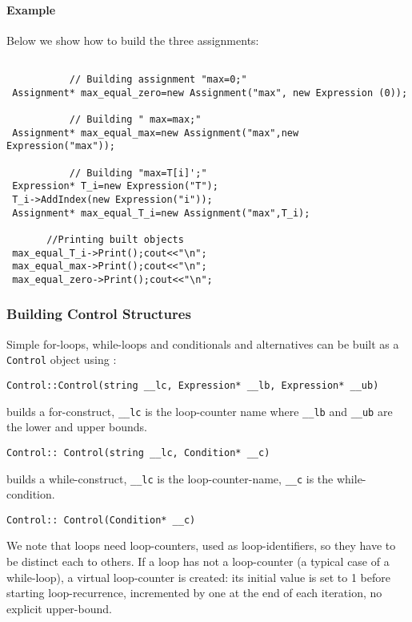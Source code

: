 \paragraph{Example}

Below we show how to build the three assignments:

\begin{lstlisting}[frame=single,framerule=0pt]

           // Building assignment "max=0;"
 Assignment* max_equal_zero=new Assignment("max", new Expression (0));

           // Building " max=max;"
 Assignment* max_equal_max=new Assignment("max",new Expression("max"));

           // Building "max=T[i]';"
 Expression* T_i=new Expression("T");
 T_i->AddIndex(new Expression("i"));
 Assignment* max_equal_T_i=new Assignment("max",T_i);

	   //Printing built objects
 max_equal_T_i->Print();cout<<"\n";
 max_equal_max->Print();cout<<"\n";
 max_equal_zero->Print();cout<<"\n";

\end{lstlisting}

\subsubsection{Building Control Structures}
Simple for-loops, while-loops and conditionals and alternatives can be built as a \verb|Control| object using :

\begin{lstlisting}[frame=single,framerule=0pt]
Control::Control(string __lc, Expression* __lb, Expression* __ub)
\end{lstlisting}
builds a for-construct, \verb|__lc| is the loop-counter name where \verb|__lb| and \verb|__ub| are the lower and upper bounds.\\
\begin{lstlisting}[frame=single,framerule=0pt]
Control:: Control(string __lc, Condition* __c)
\end{lstlisting}
builds a while-construct, \verb|__lc| is the loop-counter-name, \verb|__c| is the while-condition.\\

\begin{lstlisting}[frame=single,framerule=0pt]
Control:: Control(Condition* __c)
\end{lstlisting}

We note that loops need loop-counters, used as loop-identifiers, so they have to be distinct each to others. If a loop has not a loop-counter (a typical case of a while-loop), a virtual loop-counter is created: its initial value is set to 1 before starting loop-recurrence, incremented by one at the end of each iteration,  no explicit upper-bound.

